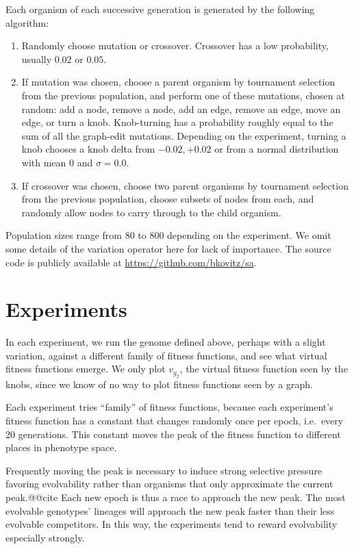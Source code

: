 \documentclass[letterpaper]{article}
\begin{document}
Each organism of each successive generation is generated by the following
algorithm:
\begin{enumerate}
  \item Randomly choose mutation or crossover. Crossover has a low probability,
    usually $0.02$ or $0.05$.
  \item If mutation was chosen, choose a parent organism by tournament selection
    from the previous population, and perform one of these mutations, chosen at
    random: add a node, remove a node, add an edge, remove an edge, move an
    edge, or turn a knob. Knob-turning has a probability roughly equal to the
    sum of all the graph-edit mutations. Depending on the experiment, turning a
    knob chooses a knob delta from ${-0.02, +0.02}$ or from a normal
    distribution with mean 0 and $\sigma = 0.0$.
  \item If crossover was chosen, choose two parent organisms by tournament
    selection from the previous population, choose subsets of nodes from each,
    and randomly allow nodes to carry through to the child organism.
\end{enumerate}
Population sizes range from 80 to 800 depending on the experiment. We omit some
details of the variation operator here for lack of importance. The source code
is publicly available at
\href{https://github.com/bkovitz/sa}{https://github.com/bkovitz/sa}.

\section{Experiments}

In each experiment, we run the genome defined above, perhaps with a slight
variation, against a different family of fitness functions, and see what
virtual fitness functions emerge. We only plot $v_{g_2}$, the virtual
fitness function seen by the knobs, since we know of no way to plot fitness
functions seen by a graph.

Each experiment tries ``family'' of fitness functions, because each experiment's
fitness function has a constant that changes randomly once per epoch, i.e.~every
20 generations. This constant moves the peak of the fitness function to
different places in phenotype space.

Frequently moving the peak is necessary to induce strong selective pressure
favoring evolvability rather than organisms that only approximate the current
peak.@@cite Each new epoch is thus a race to approach the new peak. The most
evolvable genotypes' lineages will approach the new peak faster than their
less evolvable competitors. In this way, the experiments tend to reward
evolvability especially strongly.
\end{document}

